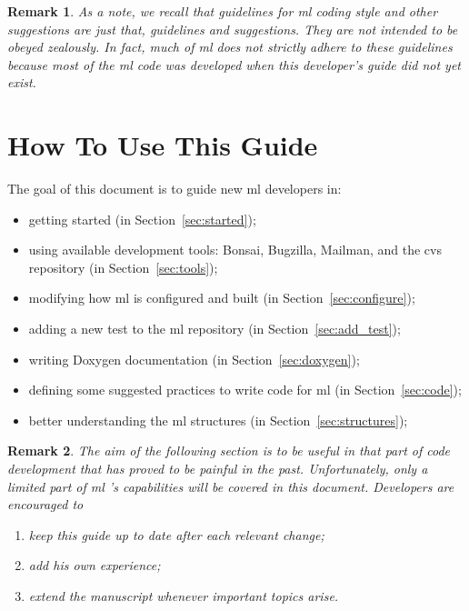 \documentclass[10pt,letter,relax]{SANDreport}
\newtheorem{remark}{Remark}
\newcommand{\ML}     {{\sc ml }}
\begin{document}
\begin{remark}
  As a note, we recall that guidelines for \ML coding style and other
  suggestions are just that, guidelines and
  suggestions. They are not intended to be obeyed zealously.
  In fact, much of \ML does not strictly adhere to these guidelines because
  most of the \ML code was developed when this developer's
  guide did not yet exist.
  
\end{remark}


\section{How To Use This Guide}
\label{sec:how}

The goal of this document is to guide new \ML developers in:
\begin{itemize}
\item getting started (in Section~\ref{sec:started});
\item using available development tools: Bonsai, Bugzilla, Mailman, and the
cvs repository 
  (in Section~\ref{sec:tools});
\item modifying how \ML is configured and built (in Section~\ref{sec:configure});
\item adding a new test to the \ML repository (in Section~\ref{sec:add_test});
\item writing Doxygen documentation (in Section~\ref{sec:doxygen});
\item defining some suggested practices to write code for \ML (in Section~\ref{sec:code});
\item better understanding the \ML structures (in Section~\ref{sec:structures});
\end{itemize}

\begin{remark}
  The aim of the following section is to be useful in that part of code
  development that has proved to be painful in the past. Unfortunately,
  only a limited part of \ML's capabilities will be covered in this
  document.
  Developers are encouraged to
  \begin{enumerate}
    \item keep this guide up to date after each relevant change;
    \item add his own experience;
    \item extend the manuscript whenever important topics arise.
  \end{enumerate}
\end{remark}
\end{document}
